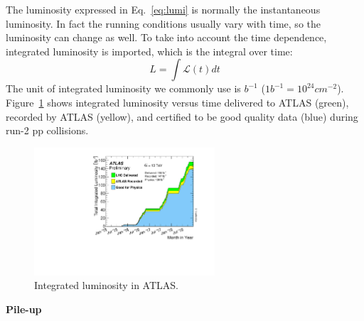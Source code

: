 The luminosity expressed in Eq.~\ref{eq:lumi} is normally the instantaneous luminosity.
In fact the running conditions usually vary with time, so the luminosity can change as well.
To take into account the time dependence, integrated luminosity is imported,
which is the integral over time:
\begin{equation}
	L = \int \mathcal{L}(t) dt
\end{equation}
The unit of integrated luminosity we commonly use is $b^{-1}$ ($1 b^{-1} = 10^{24} cm^{-2}$).
Figure~\ref{fig:lumi_vs_time} shows integrated luminosity versus time delivered to ATLAS (green), 
recorded by ATLAS (yellow), and certified to be good quality data (blue) during run-2 pp collisions.
\begin{figure}[!htb]
  \centering
  \includegraphics[width=0.6\textwidth]{figures/Detector/intlumivstimeRun2DQall.pdf}
  \caption{Integrated luminosity in ATLAS.}
  \label{fig:lumi_vs_time}
\end{figure}

\textbf{Pile-up}


